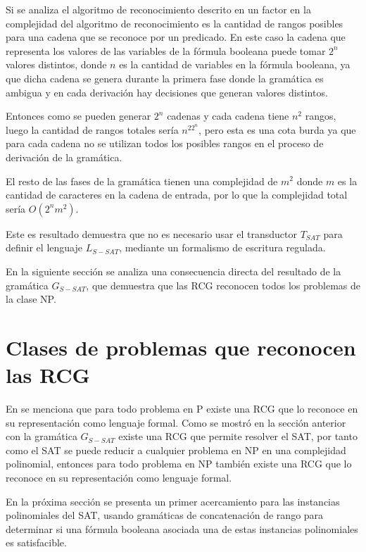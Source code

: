 \documentclass[12pt]{article}
\begin{document}
Si se analiza el algoritmo de reconocimiento descrito en \cite{mainRCGBib} un factor en la complejidad del
algoritmo de reconocimiento es la cantidad de rangos posibles para una cadena que se reconoce por un predicado.
En este caso la cadena que representa los valores de las variables de la fórmula booleana puede tomar $2^n$
valores distintos, donde $n$ es la cantidad de variables en la fórmula booleana, ya que dicha cadena se genera
durante la primera fase donde la gramática es ambigua y en cada derivación hay decisiones que generan valores
distintos.

Entonces como se pueden generar $2^n$ cadenas y cada cadena tiene $n^2$ rangos, luego la cantidad
de rangos totales sería $n^22^n$, pero esta es una cota burda ya que para cada cadena no se utilizan todos los
posibles rangos en el proceso de derivación de la gramática.

El resto de las fases de la gramática tienen una complejidad de $m^2$ donde $m$ es la cantidad de caracteres
en la cadena de entrada, por lo que la complejidad total sería $O(2^nm^2)$.

Este es resultado demuestra que no es necesario usar el transductor $T_{SAT}$ para definir el lenguaje
$L_{S-SAT}$, mediante un formalismo de escritura regulada.

En la siguiente sección se analiza una consecuencia directa del resultado de la gramática $G_{S-SAT}$, que demuestra
que las RCG reconocen todos los problemas de la clase NP.

\section{Clases de problemas que reconocen las RCG}

En \cite{propertiesRCGBib2} se menciona que para todo problema en P existe una RCG que lo reconoce en su
representación como lenguaje formal. Como se mostró en la sección anterior con la gramática $G_{S-SAT}$ existe
una RCG que permite resolver el SAT, por tanto como el SAT se puede reducir a cualquier problema en NP en una
complejidad polinomial, entonces para todo problema en NP también existe una RCG que lo reconoce en su
representación como lenguaje formal.

En la próxima sección se presenta un primer acercamiento para las instancias polinomiales del SAT, usando gramáticas de concatenación de rango
para determinar si una fórmula booleana asociada una de estas instancias polinomiales es satisfacible.
\end{document}
